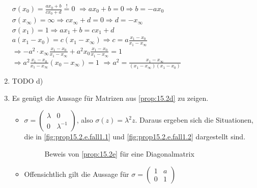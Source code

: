 \begin{beweis}
\begin{enumerate}[label=\alph*)]
              $\sigma(x_0) = \frac{ax_0 + b}{c x_0 + d} \overset{!}{=} 0$
              $\Rightarrow a x_0 + b = 0 \Rightarrow b = -a x_0$\\
              $\sigma(x_\infty) = \infty \Rightarrow c x_\infty + d = 0 \Rightarrow d = - x_\infty$\\
              $\sigma(x_1) = 1 \Rightarrow a x_1 + b = c x_1 + d$\\
              $a (x_1 - x_0) = c (x_1 - x_\infty) \Rightarrow c = a \frac{x_1 - x_0}{x_1 - x_\infty}$\\
              $\Rightarrow - a^2 \cdot x_\infty \frac{x_1 - x_0}{x_1 - x_\infty} + a^2 x_0 \frac{x_1 - x_0}{x_1 - x_\infty} = 1$\\
              $\Rightarrow a^2 \frac{x_1 - x_0}{x_1 - x_\infty} (x_0 - x_\infty) = 1$
              $\Rightarrow a^2 = \frac{x_1 - x_\infty}{(x_1 - x_\infty) (x_1 - x_0)}$
        \item TODO d)
        \item Es genügt die Aussage für Matrizen aus \cref{prop:15.2d}
              zu zeigen.
            \begin{itemize}
                \item $\sigma = \begin{pmatrix}\lambda & 0\\ 0 & \lambda^{-1}\end{pmatrix}$, also $\sigma(z) = \lambda^2 z$.
                      Daraus ergeben sich die Situationen, die in \cref{fig:prop15.2.e.fall1.1} und
                      \cref{fig:prop15.2.e.fall1.2} dargestellt sind.
                    \begin{figure}[ht]
                        \centering
                        \subfloat[Fall 1]{
                            \resizebox{0.45\linewidth}{!}{}
                            \label{fig:prop15.2.e.fall1.1}
                        }%
                        \label{fig:prop15.2.e.fall1.0}
                        \caption{Beweis von \cref{prop:15.2e} für eine Diagonalmatrix}
                    \end{figure}
                \item Offensichtlich gilt die Aussage für $\sigma = \begin{pmatrix}1 & a\\0 & 1\end{pmatrix}$

\end{itemize}
\end{enumerate}
\end{beweis}
